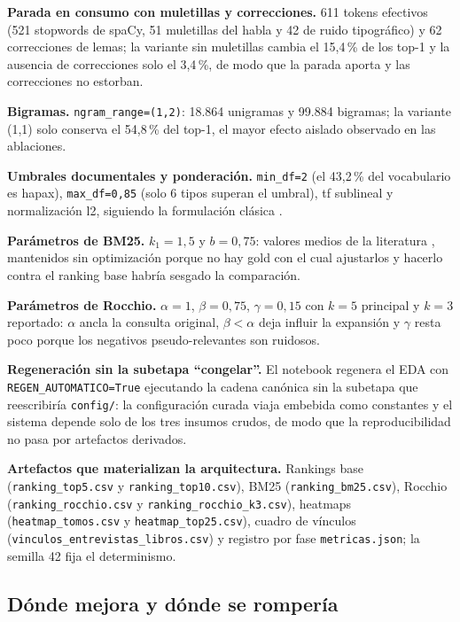 \documentclass[11pt]{tg_usta}
\begin{document}
\textbf{Parada en consumo con muletillas y correcciones.} 611 tokens efectivos (521 stopwords de spaCy, 51 muletillas del habla y 42 de ruido tipográfico) y 62 correcciones de lemas; la variante sin muletillas cambia el 15,4\,\% de los top-1 y la ausencia de correcciones solo el 3,4\,\%, de modo que la parada aporta y las correcciones no estorban.

\textbf{Bigramas.} \texttt{ngram\_range=(1,2)}: 18.864 unigramas y 99.884 bigramas; la variante (1,1) solo conserva el 54,8\,\% del top-1, el mayor efecto aislado observado en las ablaciones.

\textbf{Umbrales documentales y ponderación.} \texttt{min\_df=2} (el 43,2\,\% del vocabulario es hapax), \texttt{max\_df=0,85} (solo 6 tipos superan el umbral), tf sublineal y normalización l2, siguiendo la formulación clásica \cite{salton1988term,manning2008introduction}.

\textbf{Parámetros de BM25.} $k_1=1{,}5$ y $b=0{,}75$: valores medios de la literatura \cite{robertson2009probabilistic}, mantenidos sin optimización porque no hay gold con el cual ajustarlos y hacerlo contra el ranking base habría sesgado la comparación.

\textbf{Parámetros de Rocchio.} $\alpha=1$, $\beta=0{,}75$, $\gamma=0{,}15$ con $k=5$ principal y $k=3$ reportado: $\alpha$ ancla la consulta original, $\beta<\alpha$ deja influir la expansión y $\gamma$ resta poco porque los negativos pseudo-relevantes son ruidosos.

\textbf{Regeneración sin la subetapa \textquotedblleft congelar\textquotedblright.} El notebook regenera el EDA con \texttt{REGEN\_AUTOMATICO=True} ejecutando la cadena canónica sin la subetapa que reescribiría \texttt{config/}: la configuración curada viaja embebida como constantes y el sistema depende solo de los tres insumos crudos, de modo que la reproducibilidad no pasa por artefactos derivados.

\textbf{Artefactos que materializan la arquitectura.} Rankings base (\texttt{ranking\_top5.csv} y \texttt{ranking\_top10.csv}), BM25 (\texttt{ranking\_bm25.csv}), Rocchio (\texttt{ranking\_rocchio.csv} y \texttt{ranking\_rocchio\_k3.csv}), heatmaps (\texttt{heatmap\_tomos.csv} y \texttt{heatmap\_top25.csv}), cuadro de vínculos (\texttt{vinculos\_entrevistas\_libros.csv}) y registro por fase \texttt{metricas.json}; la semilla 42 fija el determinismo.

\subsection{Dónde mejora y dónde se rompería}
\end{document}
